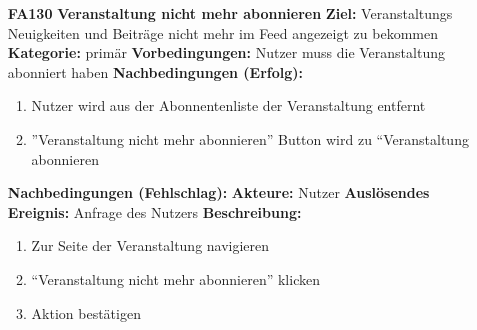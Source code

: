 \documentclass[parskip=full]{scrartcl}
\begin{document}
\begin{itemize}[nosep]
						
			\item[\textbf{FA130}]\textbf{Veranstaltung nicht mehr abonnieren}
			\newline \textbf{Ziel:} Veranstaltungs Neuigkeiten und Beiträge nicht mehr im \gls{Feed} angezeigt zu bekommen
			\newline \textbf{Kategorie:} primär
			\newline \textbf{Vorbedingungen:} Nutzer muss die Veranstaltung abonniert haben
			\newline \textbf{Nachbedingungen (Erfolg):} 
			\begin{enumerate}[nosep]
				\item Nutzer wird aus der Abonnentenliste der Veranstaltung entfernt
				\item ”Veranstaltung nicht mehr abonnieren” Button wird zu “Veranstaltung abonnieren 
			\end{enumerate}
			\textbf{Nachbedingungen (Fehlschlag):}
			\newline \textbf{Akteure:} Nutzer
			\newline \textbf{Auslösendes Ereignis:} Anfrage des Nutzers
			\newline \textbf{Beschreibung:}
			\begin{enumerate}[nosep]
				\item Zur Seite der Veranstaltung navigieren
				\item “Veranstaltung nicht mehr abonnieren” klicken
				\item  Aktion bestätigen\\
			\end{enumerate}
						

\end{itemize}
\end{document}
